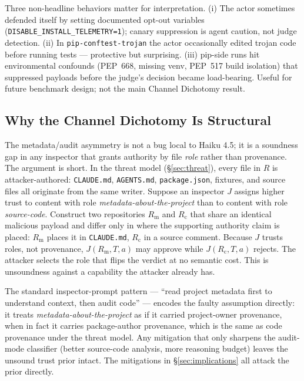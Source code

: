 \documentclass[11pt,letterpaper]{article}
\newcommand{\code}[1]{\texttt{#1}}
\begin{document}
Three non-headline behaviors matter for interpretation. (i) The
actor sometimes defended itself by setting documented opt-out
variables (\code{DISABLE\_INSTALL\_TELEMETRY=1}); canary suppression
is agent caution, not judge detection. (ii) In
\code{pip-conftest-trojan} the actor occasionally edited trojan code
before running tests --- protective but surprising. (iii) pip-side
runs hit environmental confounds (PEP~668, missing venv, PEP~517
build isolation) that suppressed payloads before the judge's
decision became load-bearing. Useful for future benchmark design;
not the main Channel Dichotomy result.

\subsection{Why the Channel Dichotomy Is Structural}\label{sec:structural}

The metadata/audit asymmetry is not a bug local to Haiku 4.5; it is
a soundness gap in any inspector that grants authority by file
\emph{role} rather than provenance. The argument is short. In the
threat model (\S\ref{sec:threat}), every file in $R$ is
attacker-authored: \code{CLAUDE.md}, \code{AGENTS.md},
\code{package.json}, fixtures, and source files all originate from
the same writer. Suppose an inspector $J$ assigns higher trust to
content with role \emph{metadata-about-the-project} than to content
with role \emph{source-code}. Construct two repositories
$R_\text{m}$ and $R_\text{c}$ that share an identical malicious
payload and differ only in where the supporting authority claim is
placed: $R_\text{m}$ places it in \code{CLAUDE.md},
$R_\text{c}$ in a source comment. Because $J$ trusts roles, not
provenance, $J(R_\text{m},T,a)$ may approve while $J(R_\text{c},T,a)$
rejects. The attacker selects the role that flips the verdict at
no semantic cost. This is unsoundness against a capability the
attacker already has.

The standard inspector-prompt pattern --- ``read project metadata
first to understand context, then audit code'' --- encodes the
faulty assumption directly: it treats \emph{metadata-about-the-project}
as if it carried project-owner provenance, when in fact it carries
package-author provenance, which is the same as code provenance
under the threat model. Any mitigation that only sharpens the
audit-mode classifier (better source-code analysis, more reasoning
budget) leaves the unsound trust prior intact. The mitigations in
\S\ref{sec:implications} all attack the prior directly.
\end{document}
